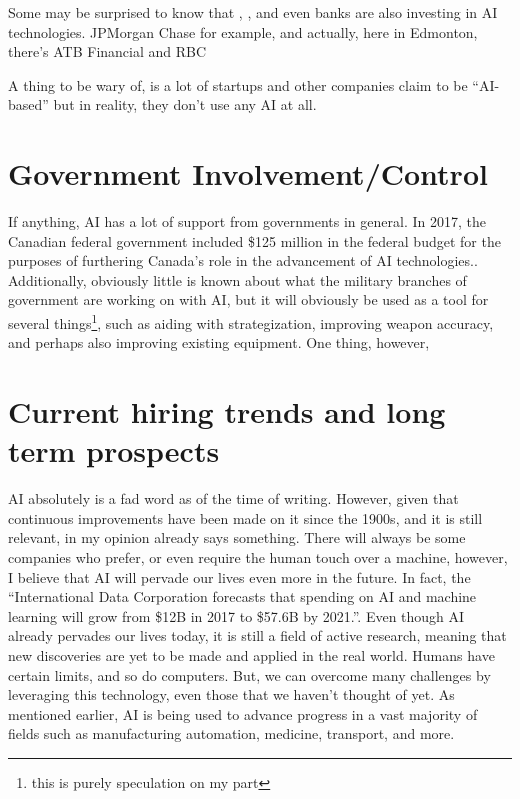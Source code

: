 \documentclass[letterpaper,12pt]{article}
\begin{document}
Some may be surprised to know that , , and even banks are also investing in AI technologies.
JPMorgan Chase for example, and actually, here in Edmonton, there's ATB Financial and RBC

A thing to be wary of, is a lot of startups and other companies claim to be ``AI-based''
but in reality, they don't use any AI at all. \cite{}


\section{Government Involvement/Control}
If anything, AI has a lot of support from governments in general.
In 2017, the Canadian federal government included \$125 million in the
federal budget for the purposes of furthering Canada's role in the
advancement of AI technologies.\cite{canadafederalfunding}. 
Additionally, obviously little is known about what the military
branches of government are working on with AI, but it will obviously
be used as a tool for several things\footnote{this is purely speculation on my part},
such as aiding with 
strategization, improving weapon accuracy, and perhaps also improving
existing equipment.
One thing, however, 

\section{Current hiring trends and long term prospects}

AI absolutely is a fad word as of the time of writing. However, given that continuous improvements
have been made on it since the 1900s, and it is still relevant, in my opinion already says something.
There will always be some companies who prefer, or even require the human touch
over a machine, however, I believe that AI will pervade our lives even more in the future.
In fact, the 
``International Data Corporation forecasts that spending on AI and machine learning will grow from \$12B in 2017 to \$57.6B by 2021.''.
\cite{forbesprojected}
Even though AI already pervades our lives today, 
it is still a field of active research\cite{uofaAI}, meaning that new
discoveries are yet to be made and applied in the real world.
Humans have certain limits, and so do computers. But, we can overcome many challenges by leveraging this technology,
even those that we haven't thought of yet. 
As mentioned earlier,
AI is being used to advance progress in a vast majority of fields
such as manufacturing automation, medicine, transport, and more.
\end{document}
